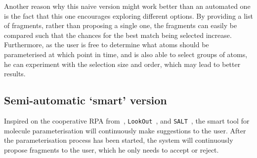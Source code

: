 Another reason why this naive version might work better than an automated one is the fact that this one encourages exploring different options. By providing a list of fragments, rather than proposing a single one, the fragments can easily be compared such that the chances for the best match being selected increase. Furthermore, as the user is free to determine what atoms should be parameterised at which point in time, and is also able to select groups of atoms, he can experiment with the selection size and order, which may lead to better results.


\subsection{Semi-automatic `smart' version}
Inspired on the cooperative RPA from~\cite{payne2000varying}, \verb|LookOut|~\cite{horvitz1999principles}, and \verb|SALT|~\cite{marcus1987taking}, the smart tool for molecule parameterisation will continuously make suggestions to the user. After the parameterisation process has been started, the system will continuously propose fragments to the user, which he only needs to accept or reject.

